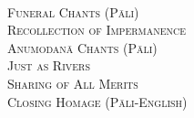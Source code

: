 {  %

  {\libertinusFont\selectfont\textbf{\textsc{}}}\\

  \textsc{
    Funeral Chants (Pāli) \pageref{pubba-bhaga-nama-kara-patho}\\
    Recollection of Impermanence \pageref{recollection-impermanence}\\
    Anumodanā Chants (Pāli) \pageref{yatha-vari-vaha-pura}\\
    Just as Rivers \pageref{just-as-rivers}\\
    Sharing of All Merits \pageref{sharing-all-merits}\\
    Closing Homage (Pāli-English) \pageref{closing-homage}}\\

}


